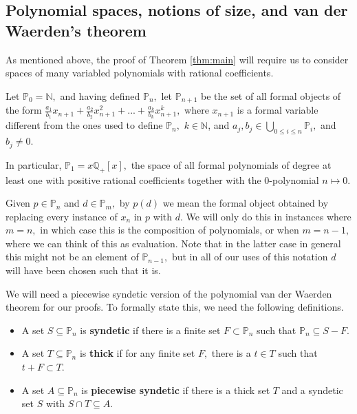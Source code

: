 \documentclass[tocmacros]{daj}
\begin{document}
\subsection{Polynomial spaces, notions of size, and van der Waerden's theorem}\label{subsection poly}

As mentioned above, the proof of Theorem \ref{thm:main} will require us to consider spaces of many variabled polynomials with rational coefficients.

\begin{definition}
Let $\mathbb{P}_0=\mathbb{N},$ and having defined $\mathbb{P}_n,$ let $\mathbb{P}_{n+1}$ be the set of all formal objects of the form $\frac{a_1}{b_1}x_{n+1}+\frac{a_2}{b_2}x_{n+1}^2+...+\frac{a_k}{b_k}x_{n+1}^k,$ where $x_{n+1}$ is a formal variable different from the ones used to define $\mathbb{P}_n,$ $k\in\mathbb{N}$, and $a_j,b_j\in \bigcup_{0\leq i\leq n} \mathbb{P}_i,$ and $b_j\neq 0.$ 
\end{definition}


In particular, $\mathbb{P}_1=x\mathbb{Q}_+[x],$ the space of all formal polynomials of degree at least one with positive rational coefficients together with the $0$-polynomial $n\mapsto 0$. 

Given $p\in \mathbb{P}_{n}$ and $d\in\mathbb{P}_m,$ by $p(d)$ we mean the formal object obtained by replacing every instance of $x_{n}$ in $p$ with $d.$  We will only do this in instances where $m=n,$ in which case this is the composition of polynomials, or when $m=n-1,$ where we can think of this as evaluation.  Note that in the latter case in general this might not be an element of $\mathbb{P}_{n-1},$ but in all of our uses of this notation $d$ will have been chosen such that it is.

We will need a piecewise syndetic version of the polynomial van der Waerden theorem for our proofs. To formally state this, we need the following definitions.  


\begin{definition}
\hspace{3mm}
\begin{itemize}
    \item A set $S\subseteq \mathbb{P}_n$ is \textbf{syndetic} if there is a finite set $F\subset\mathbb{P}_n$ such that $\mathbb{P}_n\subseteq S-F.$
    
    \item A set $T\subseteq\mathbb{P}_n$ is \textbf{thick} if for any finite set $F,$ there is a $t\in T$ such that $t+F\subset T.$
    
    \item  A set $A\subseteq\mathbb{P}_n$ is \textbf{piecewise syndetic} if there is a thick set $T$ and a syndetic set $S$ with $S\cap T\subseteq A.$
\end{itemize}
\end{definition}  
\end{document}
